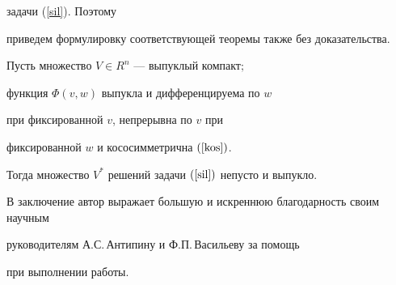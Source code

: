 задачи (\ref{sil}). Поэтому


приведем формулировку соответствующей теоремы также без доказательства.





\begin{thm}\label{exist-sil}


Пусть множество $V\in R^n$ --- выпуклый компакт$;$


функция $\Phi(v,w)$ выпукла и дифференцируема по $w$


при фиксированной $v$, непрерывна по $v$ при 


фиксированной $w$ и кососимметрична $(\ref{kos})$.


Тогда множество $V^*$ решений задачи $(\ref{sil})$ непусто и выпукло.


\end{thm}





В заключение автор выражает большую и искреннюю благодарность своим научным


руководителям А.С.\,Антипину и Ф.П.\,Васильеву за помощь


при выполнении работы.








